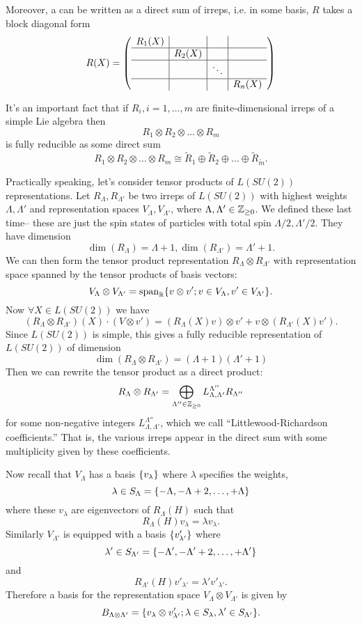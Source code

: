 \begin{defn}
Moreover, a  can be written as a direct sum of irreps, i.e. in some basis, $R$ takes a block diagonal form 
$$
R(X)=
\left(
\begin{array}{c|c|c|c}
R_1(X) &  & & \\
\hline
 & R_2(X) & & \\
\hline
& & \ddots & \\
\hline
& & & R_n(X)
\end{array}
\right)
$$
\end{defn}

It's an important fact that if $R_i, i=1,\ldots, m$ are finite-dimensional irreps of a simple Lie algebra then
$$R_1\otimes R_2 \otimes \ldots \otimes R_m$$ is fully reducible as some direct sum
$$R_1\otimes R_2 \otimes \ldots \otimes R_m\cong \tilde R_1 \oplus \tilde R_2 \oplus \ldots \oplus \tilde R_{\tilde m}.$$

Practically speaking, let's consider tensor products of $L(SU(2))$ representations. Let $R_\Lambda,R_{\Lambda'}$ be two irreps of $L(SU(2))$ with highest weights $\Lambda,\Lambda'$ and representation spaces $V_\Lambda,V_{\Lambda'}$, where $\Lambda,\Lambda' \in \mathbb{Z}_{\geq 0}$. We defined these last time-- these are just the spin states of particles with total spin $\Lambda/2,\Lambda'/2$. They have dimension
$$\dim(R_\Lambda)=\Lambda+1,\dim(R_{\Lambda'})=\Lambda'+1.$$
We can then form the tensor product representation $R_\Lambda \otimes R_{\Lambda'}$ with representation space spanned by the tensor products of basis vectors:
$$V_{\Lambda}\otimes V_{\Lambda'}=\text{span}_{\mathbb{R}} \{v\otimes v'; v\in V_\Lambda, v'\in V_{\Lambda'}\}.$$
Now $\forall X\in L(SU(2))$ we have
$$(R_\Lambda \otimes R_{\Lambda'})(X)\cdot (V\otimes v') = (R_\Lambda(X) v)\otimes v'+ v \otimes (R_{\Lambda'}(X)v').$$
Since $L(SU(2))$ is simple, this gives a fully reducible representation of $L(SU(2))$ of dimension
$$\dim(R_\Lambda \otimes R_{\Lambda'}) = (\Lambda+1)(\Lambda'+1)$$
Then we can rewrite the tensor product as a direct product:
$$R_\Lambda \otimes R_{\Lambda'}=\bigoplus_{\Lambda'' \in \mathbb{Z}_{\geq 0}} L^{\Lambda''}_{\Lambda,\Lambda'}R_{\Lambda''}$$ for some non-negative integers $L^{\Lambda''}_{\Lambda,\Lambda'}$, which we call ``Littlewood-Richardson coefficients.'' That is, the various irreps appear in the direct sum with some multiplicity given by these coefficients.

Now recall that $V_\Lambda$ has a basis $\{v_\lambda\}$ where $\lambda$ specifies the weights,
$$\lambda \in S_\Lambda = \{-\Lambda,-\Lambda+2,\ldots,+\Lambda\}$$
where these $v_\lambda$ are eigenvectors of $R_\Lambda(H)$ such that
$$R_\Lambda(H)v_\lambda = \lambda v_\lambda.$$
Similarly $V_{\Lambda'}$ is equipped with a basis
$\{v'_{\lambda'}\}$ where 
$$\lambda' \in S_{\Lambda'} = \{-\Lambda',-\Lambda'+2,\ldots,+\Lambda'\}$$
and
$$R_{\Lambda'}(H)v'_{\lambda'}=\lambda' v'_{\lambda'}.$$
Therefore a basis for the representation space $V_\Lambda \otimes V_{\Lambda'}$ is given by
$$B_{\Lambda \otimes \Lambda'} = \{v_\lambda \otimes v'_{\lambda'}; \lambda \in S_\lambda, \lambda' \in S_{\Lambda'}\}.$$

